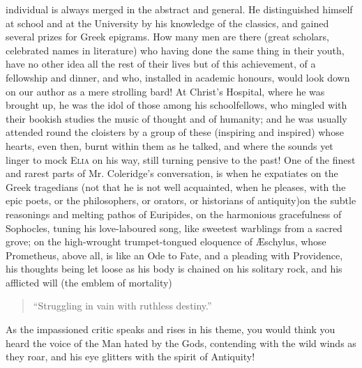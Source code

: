 individual is always merged in the abstract and general. He
distinguished himself at school and at the University by his
knowledge of the classics, and gained several prizes for Greek
epigrams. How many men are there (great scholars, celebrated names
in literature) who having done the same thing in their youth, have
no other idea all the rest of their lives but of this achievement,
of a fellowship and dinner, and who, installed in academic
honours, would look down on our author as a mere strolling bard!
At Christ's Hospital, where he was brought up, he was the idol of
those among his schoolfellows, who mingled with their bookish
studies the music of thought and of humanity; and he was usually
attended round the cloisters by a group of these (inspiring and
inspired) whose hearts, even then, burnt within them as he talked,
and where the sounds yet linger to mock \textsc{Elia} on his way, still
turning pensive to the past! One of the finest and rarest parts of
Mr. Coleridge's conversation, is when he expatiates on the Greek
tragedians (not that he is not well acquainted, when he pleases,
with the epic poets, or the philosophers, or orators, or
historians of antiquity)\textemdash on the subtle reasonings and melting
pathos of Euripides, on the harmonious gracefulness of Sophocles,
tuning his love-laboured song, like sweetest warblings from a
sacred grove; on the high-wrought trumpet-tongued eloquence of
Æschylus, whose Prometheus, above all, is like an Ode to Fate,
and a pleading with Providence, his thoughts being let loose as
his body is chained on his solitary rock, and his afflicted will
(the emblem of mortality)
\begin{quote}
  ``Struggling in vain with ruthless destiny.''
\end{quote}
As the impassioned critic speaks and rises in his theme, you would
think you heard the voice of the Man hated by the Gods, contending
with the wild winds as they roar, and his eye glitters with the
spirit of Antiquity!

